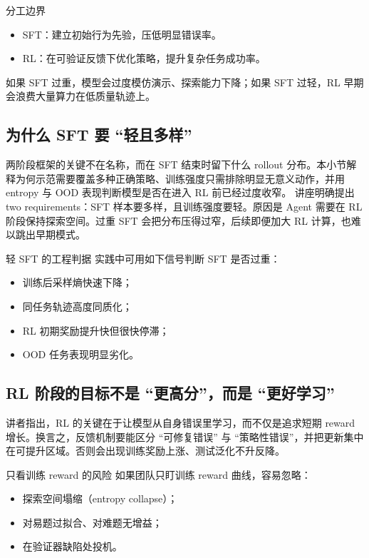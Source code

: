 \documentclass[a4paper]{article}
\begin{document}
\begin{importantbox}{分工边界}
\begin{itemize}
    \item SFT：建立初始行为先验，压低明显错误率。
    \item RL：在可验证反馈下优化策略，提升复杂任务成功率。
\end{itemize}
如果 SFT 过重，模型会过度模仿演示、探索能力下降；如果 SFT 过轻，RL 早期会浪费大量算力在低质量轨迹上。
\end{importantbox}

\subsection{为什么 SFT 要 ``轻且多样''}
两阶段框架的关键不在名称，而在 SFT 结束时留下什么 rollout 分布。本小节解释为何示范需要覆盖多种正确策略、训练强度只需排除明显无意义动作，并用 entropy 与 OOD 表现判断模型是否在进入 RL 前已经过度收窄。
讲座明确提出 two requirements：SFT 样本要多样，且训练强度要轻。原因是 Agent 需要在 RL 阶段保持探索空间。过重 SFT 会把分布压得过窄，后续即便加大 RL 计算，也难以跳出早期模式。

\begin{knowledgebox}{轻 SFT 的工程判据}
实践中可用如下信号判断 SFT 是否过重：
\begin{itemize}
    \item 训练后采样熵快速下降；
    \item 同任务轨迹高度同质化；
    \item RL 初期奖励提升快但很快停滞；
    \item OOD 任务表现明显劣化。
\end{itemize}
\end{knowledgebox}

\subsection{RL 阶段的目标不是 ``更高分''，而是 ``更好学习''}
讲者指出，RL 的关键在于让模型从自身错误里学习，而不仅是追求短期 reward 增长。换言之，反馈机制要能区分 ``可修复错误'' 与 ``策略性错误''，并把更新集中在可提升区域。否则会出现训练奖励上涨、测试泛化不升反降。

\begin{warningbox}{只看训练 reward 的风险}
如果团队只盯训练 reward 曲线，容易忽略：
\begin{itemize}
    \item 探索空间塌缩（entropy collapse）；
    \item 对易题过拟合、对难题无增益；
    \item 在验证器缺陷处投机。
\end{itemize}
\end{warningbox}
\end{document}
